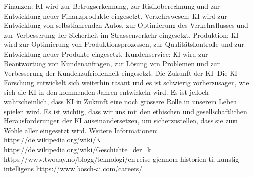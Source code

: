 Finanzen: KI wird zur Betrugserkennung, zur Risikoberechnung und zur Entwicklung neuer Finanzprodukte eingesetzt.
Verkehrswesen: KI wird zur Entwicklung von selbstfahrenden Autos, zur Optimierung des Verkehrsflusses und zur Verbesserung der Sicherheit im Strassenverkehr eingesetzt.
Produktion: KI wird zur Optimierung von Produktionsprozessen, zur Qualitätskontrolle und zur Entwicklung neuer Produkte eingesetzt.
Kundenservice: KI wird zur Beantwortung von Kundenanfragen, zur Lösung von Problemen und zur Verbesserung der Kundenzufriedenheit eingesetzt.
Die Zukunft der KI:
Die KI-Forschung entwickelt sich weiterhin rasant und es ist schwierig vorherzusagen, wie sich die KI in den kommenden Jahren entwickeln wird. Es ist jedoch wahrscheinlich, dass KI in Zukunft eine noch grössere Rolle in unserem Leben spielen wird. Es ist wichtig, dass wir uns mit den ethischen und gesellschaftlichen Herausforderungen der KI auseinandersetzen, um sicherzustellen, dass sie zum Wohle aller eingesetzt wird.
Weitere Informationen:
https://de.wikipedia.org/wiki/K%
https://de.wikipedia.org/wiki/Geschichte_der_k%
https://www.twoday.no/blogg/teknologi/en-reise-gjennom-historien-til-kunstig-intelligens
https://www.bosch-ai.com/careers/

